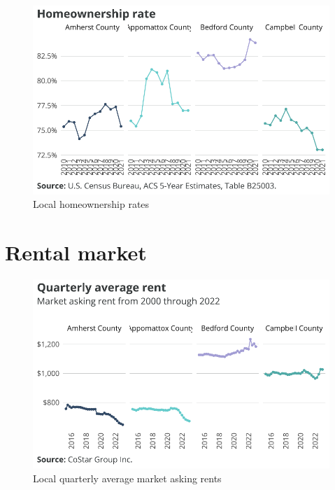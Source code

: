 \documentclass[
  letterpaper,
  DIV=11,
  numbers=noendperiod]{scrreprt}
\begin{document}
\begin{figure}[H]

{\centering \includegraphics{./part-3-2_files/figure-pdf/fig-localho-1.pdf}

}

\caption{\label{fig-localho}Local homeownership rates}

\end{figure}

\hypertarget{rental-market-1}{%
\section{Rental market}\label{rental-market-1}}

\begin{figure}[H]

{\centering \includegraphics{./part-3-2_files/figure-pdf/fig-localrent-1.pdf}

}

\caption{\label{fig-localrent}Local quarterly average market asking
rents}

\end{figure}
\end{document}
